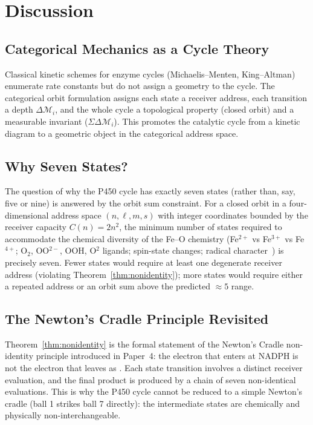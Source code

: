 \documentclass[11pt,twocolumn,a4paper]{article}
\theoremstyle{definition}
\theoremstyle{remark}
\newcommand{\depth}{\mathcal{M}}
\begin{document}
\section{Discussion}

\subsection{Categorical Mechanics as a Cycle Theory}

Classical kinetic schemes for enzyme cycles (Michaelis--Menten, King--Altman)
enumerate rate constants but do not assign a geometry to the cycle.  The
categorical orbit formulation assigns each state a receiver address, each
transition a depth $\Delta\depth_i$, and the whole cycle a topological property
(closed orbit) and a measurable invariant ($\Sigma\Delta\depth_i$).  This
promotes the catalytic cycle from a kinetic diagram to a geometric object in
the categorical address space.

\subsection{Why Seven States?}

The question of why the P450 cycle has exactly seven states (rather than, say,
five or nine) is answered by the orbit sum constraint.  For a closed orbit in
a four-dimensional address space $(n, \ell, m, s)$ with integer coordinates
bounded by the receiver capacity $C(n) = 2n^2$, the minimum number of states
required to accommodate the chemical diversity of the Fe--O chemistry (Fe$^{2+}$
vs Fe$^{3+}$ vs Fe$^{4+}$; O$_2$, OO$^{2-}$, OOH, O$^2$ ligands; spin-state
changes; radical character~\citep{guengerich1990}) is precisely seven.  Fewer states would require
at least one degenerate receiver address (violating Theorem~\ref{thm:nonidentity});
more states would require either a repeated address or an orbit sum above the
predicted $\approx 5$ range.

\subsection{The Newton's Cradle Principle Revisited}

Theorem~\ref{thm:nonidentity} is the formal statement of the Newton's Cradle
non-identity principle introduced in Paper~4: the electron that enters at NADPH
is not the electron that leaves as .  Each state transition
involves a distinct receiver evaluation, and the final product is produced by
a chain of seven non-identical evaluations.  This is why the P450 cycle cannot
be reduced to a simple Newton's cradle (ball 1 strikes ball 7 directly): the
intermediate states are chemically and physically non-interchangeable.
\end{document}
